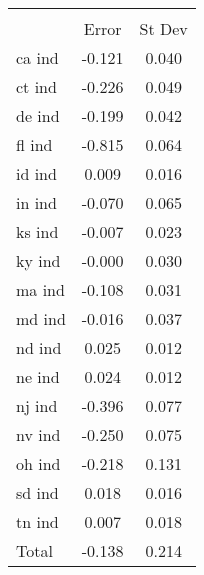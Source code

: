 {
\def\sym#1{\ifmmode^{#1}\else\(^{#1}\)\fi}
\begin{tabular}{l*{1}{cc}}
\hline\hline
                    &\multicolumn{2}{c}{}     \\
                    &       Error&      St Dev\\
\hline
ca ind              &      -0.121&       0.040\\
ct ind              &      -0.226&       0.049\\
de ind              &      -0.199&       0.042\\
fl ind              &      -0.815&       0.064\\
id ind              &       0.009&       0.016\\
in ind              &      -0.070&       0.065\\
ks ind              &      -0.007&       0.023\\
ky ind              &      -0.000&       0.030\\
ma ind              &      -0.108&       0.031\\
md ind              &      -0.016&       0.037\\
nd ind              &       0.025&       0.012\\
ne ind              &       0.024&       0.012\\
nj ind              &      -0.396&       0.077\\
nv ind              &      -0.250&       0.075\\
oh ind              &      -0.218&       0.131\\
sd ind              &       0.018&       0.016\\
tn ind              &       0.007&       0.018\\
Total               &      -0.138&       0.214\\
\hline\hline
\end{tabular}
}
